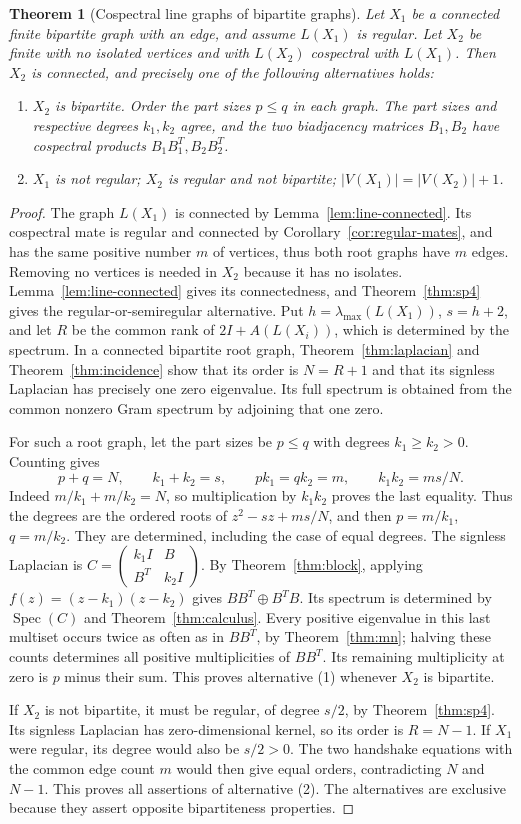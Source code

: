 \documentclass[11pt]{article}
\newcommand\pmat[1]{\begin{pmatrix} #1 \end{pmatrix}}
\newtheorem{theorem}{Theorem}[section]
\theoremstyle{definition}
\DeclareMathOperator{\Spec}{Spec}
\begin{document}
\begin{theorem}[Cospectral line graphs of bipartite graphs]\label{thm:line-bipartite}
Let $X_1$ be a connected finite bipartite graph with an edge, and
assume $L(X_1)$ is regular. Let $X_2$ be finite with no isolated
vertices and with $L(X_2)$ cospectral with $L(X_1)$. Then $X_2$ is
connected, and precisely one of the following alternatives holds:
\begin{enumerate}
\item $X_2$ is bipartite. Order the part sizes $p\le q$ in each
graph. The part sizes and respective degrees $k_1,k_2$ agree, and
the two biadjacency matrices $B_1,B_2$ have cospectral products
$B_1B_1^T,B_2B_2^T$.
\item $X_1$ is not regular; $X_2$ is regular and not bipartite;
$|V(X_1)|=|V(X_2)|+1$.
\end{enumerate}
\end{theorem}
\begin{proof}
The graph $L(X_1)$ is connected by Lemma~\ref{lem:line-connected}.
Its cospectral mate is regular and connected by
Corollary~\ref{cor:regular-mates}, and has the same positive number $m$ of vertices,
thus both root graphs have $m$ edges. Removing no vertices is needed
in $X_2$ because it has no isolates. Lemma~\ref{lem:line-connected}
gives its connectedness, and Theorem~\ref{thm:sp4} gives the
regular-or-semiregular alternative.
Put $h=\lambda_{\max}(L(X_1))$, $s=h+2$, and let $R$ be the common
rank of $2I+A(L(X_i))$, which is determined by the spectrum. In a
connected bipartite root graph, Theorem~\ref{thm:laplacian} and
Theorem~\ref{thm:incidence} show that its order is $N=R+1$ and that
its signless Laplacian has precisely one zero eigenvalue. Its full
spectrum is obtained from the common nonzero Gram spectrum by
adjoining that one zero.

For such a root graph, let the part sizes be $p\le q$ with degrees
$k_1\ge k_2>0$. Counting gives
\[
 p+q=N,\qquad k_1+k_2=s,\qquad pk_1=qk_2=m,
 \qquad k_1k_2=ms/N.
\]
Indeed $m/k_1+m/k_2=N$, so multiplication by $k_1k_2$ proves the
last equality. Thus the degrees are the ordered roots of
$z^2-sz+ms/N$, and then $p=m/k_1$, $q=m/k_2$.
They are determined, including the case of equal degrees.
The signless Laplacian is
$C=\pmat{k_1I&B\\B^T&k_2I}$. By Theorem~\ref{thm:block}, applying
$f(z)=(z-k_1)(z-k_2)$ gives $BB^T\oplus B^TB$.
Its spectrum is determined by $\Spec(C)$ and
Theorem~\ref{thm:calculus}. Every positive eigenvalue in this last
multiset occurs twice as often as in $BB^T$, by
Theorem~\ref{thm:mn}; halving these counts determines all positive
multiplicities of $BB^T$. Its remaining multiplicity at zero is $p$
minus their sum. This proves alternative (1) whenever $X_2$ is bipartite.

If $X_2$ is not bipartite, it must be regular, of degree $s/2$,
by Theorem~\ref{thm:sp4}. Its signless Laplacian has zero-dimensional
kernel, so its order is $R=N-1$. If $X_1$ were regular, its degree
would also be $s/2>0$. The two handshake equations with the common
edge count $m$ would then give equal orders, contradicting $N$ and
$N-1$. This proves all assertions of alternative (2). The alternatives
are exclusive because they assert opposite bipartiteness properties.
\end{proof}
\end{document}
